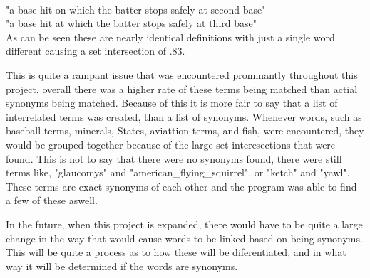 \documentclass{article}
\begin{document}
\begin{addmargin}[4em]{4em}
\\"a base hit on which the batter stops safely at second base"
\\"a base hit at which the batter stops safely at third base" 
\\As can be seen these are nearly identical definitions with just a single word different causing a set intersection of .83. 
\par This is quite a rampant issue that was encountered prominantly throughout this project, overall there was a higher rate of these terms being matched than actial synonyms being matched. Because of this it is more fair to say that a list of interrelated terms was created, than a list of synonyms. Whenever words, such as baseball terms, minerals, States, aviattion terms, and fish, were encountered, they would be grouped together because of the large set interesections that were found. This is not to say that there were no synonyms found, there were still terms like, "glaucomys" and "american\_flying\_squirrel", or "ketch" and "yawl". These terms are exact synonyms of each other and the program was able to find a few of these aswell.
\par In the future, when this project is expanded, there would have to be quite a large change in the way that would cause words to be linked based on being synonyms. This will be quite a process as to how these will be diferentiated, and in what way it will be determined if the words are synonyms.
\end{addmargin}
\end{document}
